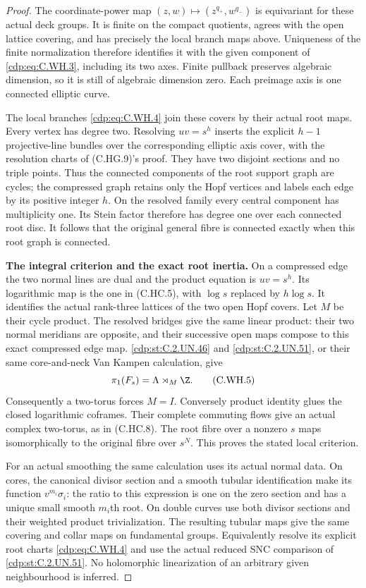 \begin{proof}
The coordinate-power map
$(z,w)\mapsto(z^{q_+},w^{q_-})$
is equivariant for these actual deck
groups. It is finite on the compact
quotients, agrees with the open
lattice covering, and has precisely
the local branch maps above. Uniqueness
of the finite normalization therefore
identifies it with the given component
of \eqref{cdp:eq:C.WH.3}, including its two axes.
Finite pullback preserves algebraic
dimension, so it is still of algebraic
dimension zero. Each preimage axis is
one connected elliptic curve.

The local branches \eqref{cdp:eq:C.WH.4} join these
covers by their actual root maps.
Every vertex has degree two. Resolving
$uv=s^h$ inserts the explicit $h-1$
projective-line bundles over the
corresponding elliptic axis cover,
with the resolution charts of
(C.HG.9)'s proof. They have two
disjoint sections and no triple
points. Thus the connected components
of the root support graph are cycles;
the compressed graph retains only
the Hopf vertices and labels each
edge by its positive integer $h$.
On the resolved family every central
component has multiplicity one.
Its Stein factor therefore has degree
one over each connected root disc.
It follows that the original general
fibre is connected exactly when this
root graph is connected.

\par\medskip\noindent\textbf{The integral criterion and the exact root inertia.}
On a compressed edge the two normal
lines are dual and the product equation
is $uv=s^h$. Its logarithmic map is
the one in (C.HC.5), with $\log s$
replaced by $h\log s$. It identifies
the actual rank-three lattices of
the two open Hopf covers. Let $M$
be their cycle product. The resolved
bridges give the same linear product:
their two normal meridians are
opposite, and their successive open
maps compose to this exact compressed
edge map. \ref{cdp:st:C.2.UN.46} and \ref{cdp:st:C.2.UN.51}, or their
same core-and-neck Van Kampen
calculation, give
\[
                  \pi_1(F_s)=\Lambda\rtimes_M\Z.
\tag{C.WH.5}\label{cdp:eq:C.WH.5}
\]
Consequently a two-torus forces $M=I$.
Conversely product identity glues
the closed logarithmic coframes.
Their complete commuting flows give
an actual complex two-torus, as in
(C.HC.8). The root fibre over a
nonzero $s$ maps isomorphically to
the original fibre over $s^N$.
This proves the stated local criterion.

For an actual smoothing the same
calculation uses its actual normal
data. On cores, the canonical divisor
section and a smooth tubular
identification make its function
$v^{m_i}\sigma_i$: the ratio to this
expression is one on the zero
section and has a unique small smooth
$m_i$th root. On double curves use
both divisor sections and their
weighted product trivialization.
The resulting tubular maps give the
same covering and collar maps on
fundamental groups. Equivalently
resolve its explicit root charts
\eqref{cdp:eq:C.WH.4} and use the actual reduced
SNC comparison of \ref{cdp:st:C.2.UN.51}. No holomorphic
linearization of an arbitrary given
neighbourhood is inferred.


\end{proof}
